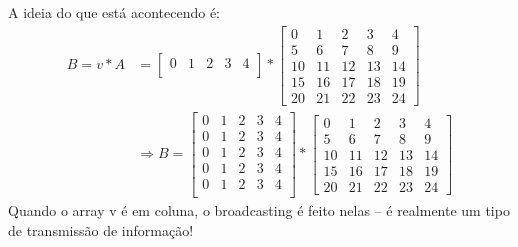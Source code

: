 \documentclass[../numerical_methods.tex]{subfiles}
\begin{document}
A ideia do que está acontecendo é:
\begin{align*}
	B = v*A & = \begin{bmatrix}
		            0 & 1 & 2 & 3 & 4 \\
	            \end{bmatrix} * \begin{bmatrix}
		                            0  & 1  & 2  & 3  & 4  \\
		                            5  & 6  & 7  & 8  & 9  \\
		                            10 & 11 & 12 & 13 & 14 \\
		                            15 & 16 & 17 & 18 & 19 \\
		                            20 & 21 & 22 & 23 & 24
	                            \end{bmatrix}               \\
	        & \Rightarrow B = \begin{bmatrix}
		                          0 & 1 & 2 & 3 & 4 \\
		                          0 & 1 & 2 & 3 & 4 \\
		                          0 & 1 & 2 & 3 & 4 \\
		                          0 & 1 & 2 & 3 & 4 \\
		                          0 & 1 & 2 & 3 & 4 \\
	                          \end{bmatrix} * \begin{bmatrix}
		                                          0  & 1  & 2  & 3  & 4  \\
		                                          5  & 6  & 7  & 8  & 9  \\
		                                          10 & 11 & 12 & 13 & 14 \\
		                                          15 & 16 & 17 & 18 & 19 \\
		                                          20 & 21 & 22 & 23 & 24
	                                          \end{bmatrix}
\end{align*}
Quando o array v é em coluna, o broadcasting é feito nelas -- é realmente um tipo de transmissão de informação!
\end{document}
